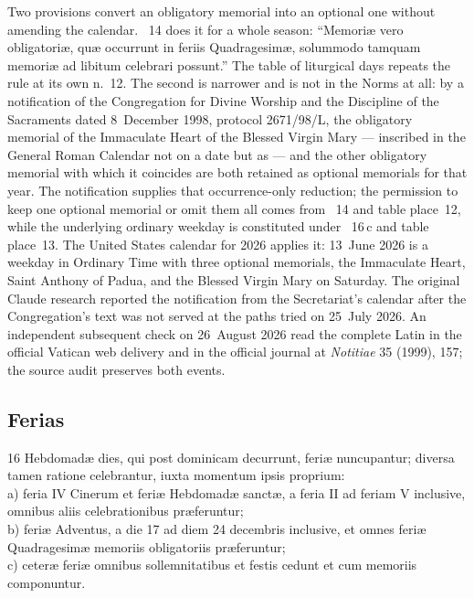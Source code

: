 Two provisions convert an obligatory memorial into an optional one without amending the calendar.
~14 does it for a whole season: ``Memoriæ vero obligatoriæ, quæ occurrunt in feriis
Quadragesimæ, solummodo tamquam memoriæ ad libitum celebrari possunt.'' The table of liturgical
days repeats the rule at its own n.~12. The second is narrower and is not in the Norms at all: by a
notification of the Congregation for Divine Worship and the Discipline of the Sacraments dated
8~December 1998, protocol 2671/98/L, the obligatory memorial of the Immaculate Heart of the Blessed
Virgin Mary --- inscribed in the General Roman Calendar not on a date but as  --- and the other obligatory memorial with which it coincides
are both retained as optional memorials for that year. The notification supplies that
occurrence-only reduction; the permission to keep one optional memorial or omit them all comes from
~14 and table place~12, while the underlying ordinary weekday is constituted under
~16\,c and table place~13. The United States
calendar for 2026 applies it: 13~June 2026 is a weekday in Ordinary Time with three optional
memorials, the Immaculate Heart, Saint Anthony of Padua, and the Blessed Virgin Mary on Saturday.
The original Claude research reported the notification from the Secretariat's calendar after the
Congregation's text was not served at the paths tried on 25~July 2026. An independent subsequent
check on 26~August 2026 read the complete Latin in the official Vatican web delivery and in the
official journal at \emph{Notitiae} 35 (1999), 157; the source audit preserves both events.

\subsection{Ferias}

\begin{normtext}{ 16}
Hebdomadæ dies, qui post dominicam decurrunt, feriæ nuncupantur; diversa tamen ratione celebrantur,
iuxta momentum ipsis proprium:\\
a) feria IV Cinerum et feriæ Hebdomadæ sanctæ, a feria II ad feriam V inclusive, omnibus aliis
celebrationibus præferuntur;\\
b) feriæ Adventus, a die 17 ad diem 24 decembris inclusive, et omnes feriæ Quadragesimæ memoriis
obligatoriis præferuntur;\\
c) ceteræ feriæ omnibus sollemnitatibus et festis cedunt et cum memoriis componuntur.
\end{normtext}

